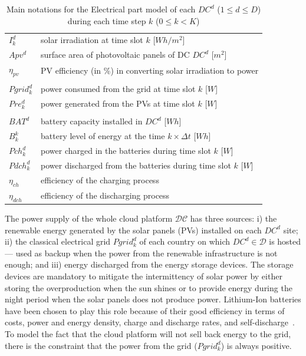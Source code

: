 \begin{table}[t]
\caption{Main notations for the Electrical part model of each $DC^d$ ($1\leq d\leq D$) during each time step $k$ ($0\leq k<K$)\label{table:variablesElec}}
\begin{center}
\begin{tabular}{l p{6cm}}
$I^d_k$ & solar irradiation at time slot $k$ [$Wh/m^2$] \\
$Apv^d$ & surface area of photovoltaic panels of DC $DC^d$ [$m^2$] \\ 
$\eta_{pv}$ & PV efficiency (in \%) in converting solar irradiation to power \\
\\
$Pgrid_k^d$ & power consumed from the grid at time slot $k$ [$W$]\\
$Pre_k^d$ & power generated from the PVs at time slot $k$ [$W$] \\
\\
$BAT^d$ & battery capacity installed in $DC^d$ [$Wh$] \\
$B_k^k$ & battery level of energy at the time $k\times\Delta t$ [$Wh$] \\
$Pch_k^d$ & power charged in the batteries during time slot $k$ [$W$]\\
$Pdch_k^d$ & power discharged from the batteries during time slot $k$ [$W$] \\
$\eta_{ch}$ & efficiency of the charging process  \\
$\eta_{dch}$ & efficiency of the discharging process  \\

\end{tabular}
\end{center}
\end{table}

The power supply of the whole cloud platform $\mathcal{DC}$ has three sources: i) the renewable energy generated by the solar panels (PVs) installed on each $DC^d$ site; ii)  the classical electrical grid $Pgrid_k^d$ of each country on which $DC^d\in\mathcal{D}$ is hosted --- used as backup when the power from the renewable infrastructure is not enough; and iii) energy discharged from the energy storage devices. The storage devices are mandatory to mitigate the intermittency of solar power by either storing the overproduction when the sun shines or to provide energy during the night period when the solar panels does not produce power. Lithium-Ion batteries have been chosen to play this role because of their good efficiency in terms of costs, power and energy density, charge and discharge rates, and self-discharge~\cite{wang2012_EDCS}. To model the fact that the cloud platform will not sell back energy to the grid, there is the constraint that the power from the grid ($Pgrid^d_k$) is always positive. 

